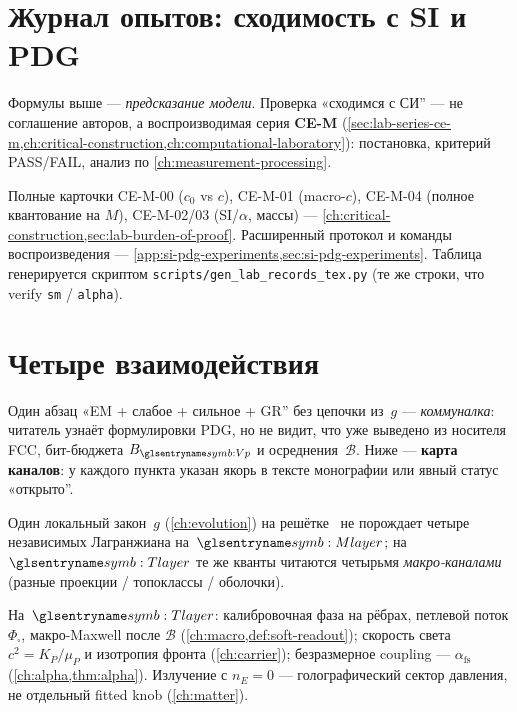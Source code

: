 \section{Журнал опытов: сходимость с SI и PDG}
\label{sec:si-pdg-experiments-journal}

Формулы выше --- \emph{предсказание модели}.
Проверка «сходимся с СИ'' --- не соглашение авторов, а воспроизводимая серия
\textbf{CE-M} (\cref{sec:lab-series-ce-m,ch:critical-construction,ch:computational-laboratory}):
постановка, критерий PASS/FAIL, анализ по \cref{ch:measurement-processing}.



\noindent
Полные карточки CE-M-00 ($c_0$ vs $c$), CE-M-01 (macro-$c$), CE-M-04 (полное квантование на $M$), CE-M-02/03 (SI/$\alpha$, массы) ---
\cref{ch:critical-construction,sec:lab-burden-of-proof}.
Расширенный протокол и команды воспроизведения ---
\cref{app:si-pdg-experiments,sec:si-pdg-experiments}.
Таблица генерируется скриптом \texttt{scripts/gen\_lab\_records\_tex.py}
(те же строки, что verify \texttt{sm} / \texttt{alpha}).

\section{Четыре взаимодействия}
\label{sec:four-forces-map}

\begin{remark}
Один абзац «EM + слабое + сильное + GR'' без цепочки из~$g$ --- \emph{коммуналка}:
читатель узнаёт формулировки PDG, но не видит, что уже выведено из носителя FCC,
бит-бюджета $B_{\hv}$ и осреднения~$\mathcal{B}$.
Ниже --- \textbf{карта каналов}: у каждого пункта указан якорь в тексте монографии
или явный статус «открыто''.
\end{remark}

Один локальный закон~$g$ (\cref{ch:evolution}) на решётке \latGCKshort\ не порождает
четыре независимых Лагранжиана на~$\Mlayer$; на~$\Tlayer$ те же кванты читаются
четырьмя \emph{макро-каналами} (разные проекции / топоклассы / оболочки).

\begin{proposition}
\label{prop:channel-em}
На~$\Tlayer$: калибровочная фаза на рёбрах, петлевой поток $\Phi_\square$,
макро-Maxwell после $\mathcal{B}$ (\cref{ch:macro,def:soft-readout});
скорость света $c^2=K_P/\mu_P$ и изотропия фронта (\cref{ch:carrier});
безразмерное coupling --- $\alpha_{\mathrm{fs}}$ (\cref{ch:alpha,thm:alpha}).
Излучение с $n_E=0$ --- голографический сектор давления, не отдельный fitted knob
(\cref{ch:matter}).
\end{proposition}

